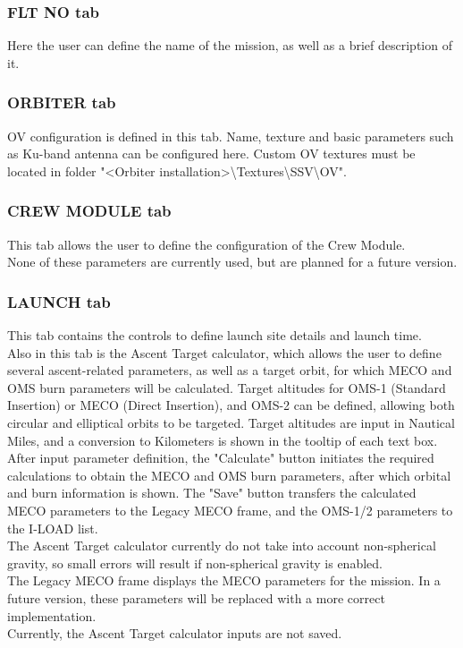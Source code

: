 \documentclass[Space_Shuttle_Vessel_Manual.tex]{subfiles}
\begin{document}
\begin{multicols*}{2}
\subsubsection{FLT NO tab}
Here the user can define the name of the mission, as well as a brief description of it.


\subsubsection{ORBITER tab}
OV configuration is defined in this tab. Name, texture and basic parameters such as Ku-band antenna can be configured here.
Custom OV textures must be located in folder "<Orbiter installation>\textbackslash Textures\textbackslash SSV\textbackslash OV".


\subsubsection{CREW MODULE tab}
This tab allows the user to define the configuration of the Crew Module.\\
None of these parameters are currently used, but are planned for a future version.


\subsubsection{LAUNCH tab}
This tab contains the controls to define launch site details and launch time.\\
Also in this tab is the Ascent Target calculator, which allows the user to define several ascent-related parameters, as well as a target orbit, for which MECO and OMS burn parameters will be calculated. Target altitudes for OMS-1 (Standard Insertion) or MECO (Direct Insertion), and OMS-2 can be defined, allowing both circular and elliptical orbits to be targeted. Target altitudes are input in Nautical Miles, and a conversion to Kilometers is shown in the tooltip of each text box.\\
After input parameter definition, the "Calculate" button initiates the required calculations to obtain the MECO and OMS burn parameters, after which orbital and burn information is shown. The "Save" button transfers the calculated MECO parameters to the Legacy MECO frame, and the OMS-1/2 parameters to the I-LOAD list.\\
The Ascent Target calculator currently do not take into account non-spherical gravity, so small errors will result if non-spherical gravity is enabled.\\
The Legacy MECO frame displays the MECO parameters for the mission. In a future version, these parameters will be replaced with a more correct implementation.\\
Currently, the Ascent Target calculator inputs are not saved.\\



\end{multicols*}
\end{document}

